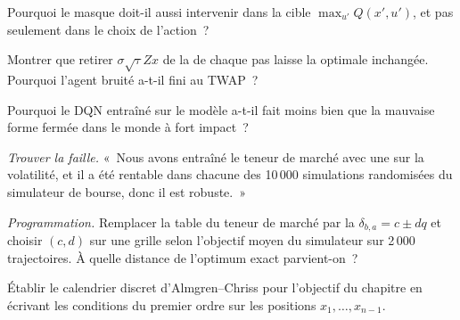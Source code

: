 \begin{exercise}[$\star$]\label{exo:ml:reinforcement-learning-for-execution-and-market-making:3}
Pourquoi le masque doit-il aussi intervenir dans la cible $\max_{u'}Q(x', u')$, et pas seulement dans le choix de l'action~?
\end{exercise}

\begin{exercise}[$\star\star$]\label{exo:ml:reinforcement-learning-for-execution-and-market-making:4}
Montrer que retirer $\sigma\sqrt\tau Zx$ de la  de chaque pas laisse la  optimale inchangée. Pourquoi l'agent bruité
a-t-il fini au TWAP~?
\end{exercise}

\begin{exercise}[$\star\star$]\label{exo:ml:reinforcement-learning-for-execution-and-market-making:5}
Pourquoi le DQN entraîné sur le modèle a-t-il fait moins bien que la mauvaise forme fermée dans le monde à fort impact~?
\end{exercise}

\begin{exercise}[$\star\star$]\label{exo:ml:reinforcement-learning-for-execution-and-market-making:6}
\emph{Trouver la faille.} «~Nous avons entraîné le teneur de marché avec une  sur la volatilité, et il a été rentable dans chacune des
10\,000 simulations randomisées du simulateur de bourse, donc il est robuste.~»
\end{exercise}

\begin{exercise}[$\star\star\star$]\label{exo:ml:reinforcement-learning-for-execution-and-market-making:7}
\emph{Programmation.} Remplacer la table du teneur de marché par la  $\delta_{b,a} = c\pm dq$ et choisir $(c, d)$ sur une grille selon
l'objectif moyen du simulateur sur 2\,000 trajectoires. À quelle distance de l'optimum exact parvient-on~?
\end{exercise}

\begin{exercise}[$\star\star\star$]\label{exo:ml:reinforcement-learning-for-execution-and-market-making:8}
Établir le calendrier discret d'Almgren--Chriss pour l'objectif du chapitre en écrivant les conditions du premier ordre sur les
positions $x_1,\dots,x_{n-1}$.
\end{exercise}


